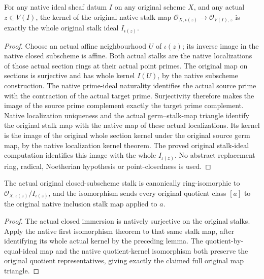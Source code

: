 \begin{lemma}
\label{lem:node-fitting-ideal-sheaf-stalk-kernel}
\leanok
For any native ideal sheaf datum $I$ on any original scheme $X$, and any
actual $z\in V(I)$, the kernel of the original native stalk map
$\mathcal O_{X,\iota(z)}\to\mathcal O_{V(I),z}$ is exactly the whole
original stalk ideal $I_{\iota(z)}$.
\end{lemma}
\begin{proof}
Choose an actual affine neighbourhood $U$ of $\iota(z)$; its inverse
image in the native closed subscheme is affine. Both actual stalks are
the native localizations of those actual section rings at their actual
point primes. The original map on sections is surjective and has whole
kernel $I(U)$, by the native subscheme construction. The native
prime-ideal naturality identifies the actual source prime with the
contraction of the actual target prime. Surjectivity therefore makes the
image of the source prime complement exactly the target prime complement.
Native localization uniqueness and the actual germ--stalk-map triangle
identify the original stalk map with the native map of these actual
localizations. Its kernel is the image of the original whole section
kernel under the original source germ map, by the native localization
kernel theorem. The proved original stalk-ideal computation identifies
this image with the whole $I_{\iota(z)}$. No abstract replacement ring,
radical, Noetherian hypothesis or point-closedness is used.
\end{proof}

\endgroup

\begingroup

\begin{theorem}
\label{thm:node-fitting-ideal-sheaf-actual-stalk-quotient}
\leanok
The actual original closed-subscheme stalk is canonically ring-isomorphic
to $\mathcal O_{X,\iota(z)}/I_{\iota(z)}$, and the isomorphism sends every
original quotient class $[a]$ to the original native inclusion stalk map
applied to $a$.
\end{theorem}
\begin{proof}
The actual closed immersion is natively surjective on the original
stalks. Apply the native first isomorphism theorem to that same stalk
map, after identifying its whole actual kernel by the preceding lemma.
The quotient-by-equal-ideal map and the native quotient-kernel isomorphism
both preserve the original quotient representatives, giving exactly the
claimed full original map triangle.
\end{proof}

